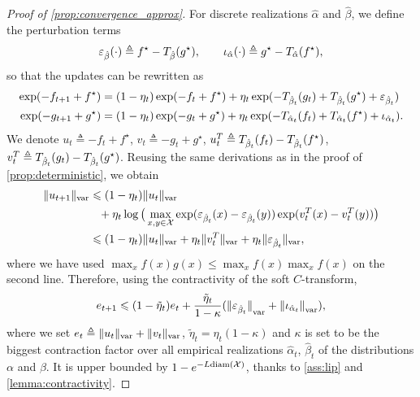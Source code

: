 \begin{proof}[Proof of \autoref{prop:convergence_approx}]
For discrete realizations $\hat \alpha$ and $\hat \beta$, we define the perturbation terms
\begin{equation}
    \epsilon_{\hat \beta}(\cdot) \triangleq
    f^\star - \Ctrans{g^\star}{\hat \beta} ,\qquad
    \iota_{\hat \alpha}(\cdot) \triangleq 
    g^\star - \Ctrans{f^\star}{\hat \alpha},
\end{equation}
so that the updates can be rewritten as
\begin{align}
    \exp(-f_{t+1} + f^\star) &= (1 - \eta_t)
    \exp(-f_{t} + f^\star)
    + \eta_t \exp(-\Ctrans{g_t}{\hat \beta_t} 
    +\Ctrans{g^\star}{\hat \beta_t} + \epsilon_{\hat \beta_t}) \\
    \exp(-g_{t+1} + g^\star) &= (1 - \eta_t)
    \exp(-g_{t} + g^\star)
    + \eta_t \exp(-\Ctrans{f_t}{\hat \alpha_t} 
    +\Ctrans{f^\star}{\hat \alpha_t} + \iota_{\hat \alpha_t}).
\end{align}
We denote $u_t \triangleq -f_{t} + f^\star$, $v_t \triangleq -g_{t} + g^\star$, $u_t^T \triangleq
\Ctrans{f_t}{\hat \beta_t} - \Ctrans{f^\star}{\hat \beta_t}$, $v_t^T \triangleq
\Ctrans{g_t}{\hat \beta_t} - \Ctrans{g^\star}{\hat \beta_t}$. Reusing the same
derivations as in the proof of \autoref{prop:deterministic}, we obtain
    \label{eq:pre_ineq_var}
    \begin{align}
    \Vert u_{t+1} \Vert_{\var} &\leq
    (1 - \eta_t) \Vert u_t \Vert_{\var}
    \\
    &\phantom{=}+ \eta_t \log \big( \max_{x, y \in \Xx}
    \exp(\epsilon_{\hat \beta_t}(x) 
    - \epsilon_{\hat \beta_t}(y)) \exp(v_t^T(x) - v_t^T(y)) \big) \\ 
    &\leq
    (1 - \eta_t) \Vert u_t \Vert_{\var}
    + \eta_t \Vert v_t^T \Vert_{\var}
    + \eta_t \Vert \epsilon_{\hat \beta_t} \Vert_{\var},
\end{align}
where we have used $\max_x f(x) g(x) \leq \max_x f(x) \max_x f(x)$ on the second line. Therefore,
using the contractivity of the soft $C$-transform,
\begin{equation}
    \label{eq:ineq_var}
    e_{t+1} \leq 
    (1 - \tilde \eta_t) e_t
    +  \frac{\tilde \eta_t}{1 -\kappa}
    ({\Vert \epsilon_{\hat \beta_t} \Vert}_{\var} + 
    {\Vert \iota_{\hat \alpha_t} \Vert}_{\var}),
\end{equation}
where we set $e_t \triangleq \Vert u_t \Vert_{\var} + \Vert v_t \Vert_{\var}$,
$\tilde \eta_t = \eta_t (1-\kappa)$ and $\kappa$ is set to be the biggest
contraction factor over all empirical realizations $\hat \alpha_t$, $\hat
\beta_t$ of the distributions $\alpha$ and $\beta$. It is upper bounded by $1 -
e^{- L\text{diam}(\Xx)}$, thanks to \autoref{ass:lip} and
\autoref{lemma:contractivity}.


\end{proof}
